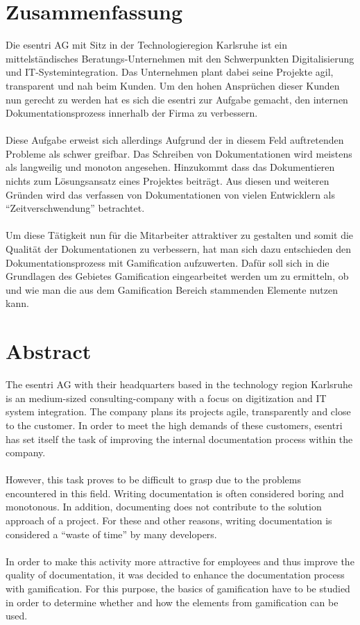 \documentclass[a4paper,12pt,twoside]{scrartcl}
\begin{document}
\section*{Zusammenfassung}
Die esentri AG mit Sitz in der Technologieregion Karlsruhe ist ein mittelständisches Beratungs-Unternehmen mit den Schwerpunkten Digitalisierung und IT-Systemintegration. 
Das Unternehmen plant dabei seine Projekte agil, transparent und nah beim Kunden.
Um den hohen Ansprüchen dieser Kunden nun gerecht zu werden hat es sich die esentri zur Aufgabe gemacht, den internen Dokumentationsprozess innerhalb der Firma zu verbessern. 
\\\\
Diese Aufgabe erweist sich allerdings Aufgrund der in diesem Feld auftretenden Probleme als schwer greifbar. Das Schreiben von Dokumentationen wird meistens als langweilig und monoton angesehen. Hinzukommt dass das Dokumentieren nichts zum Lösungsansatz eines Projektes beiträgt. Aus diesen und weiteren Gründen wird das verfassen von Dokumentationen von vielen Entwicklern als “Zeitverschwendung” betrachtet. 
\\\\
Um diese Tätigkeit nun für die Mitarbeiter attraktiver zu gestalten und somit die Qualität der Dokumentationen zu verbessern, hat man sich dazu entschieden den Dokumentationsprozess mit Gamification aufzuwerten. Dafür soll sich in die Grundlagen des Gebietes Gamification eingearbeitet werden um zu ermitteln, ob und wie man die aus dem Gamification Bereich stammenden Elemente nutzen kann.


\section*{Abstract}
The esentri AG with their headquarters based in the technology region Karlsruhe is an medium-sized consulting-company with a focus on digitization and IT system integration. The company plans its projects agile, transparently and close to the customer. In order to meet the high demands of these customers, esentri has set itself the task of improving the internal documentation process within the company. 
\\\\
However, this task proves to be difficult to grasp due to the problems encountered in this field. Writing documentation is often considered boring and monotonous. In addition, documenting does not contribute to the solution approach of a project. For these and other reasons, writing documentation is considered a \enquote{waste of time} by many developers. 
\\\\
In order to make this activity more attractive for employees and thus improve the quality of documentation, it was decided to enhance the documentation process with gamification. For this purpose, the basics of gamification have to be studied in order to determine whether and how the elements from gamification can be used.     
\newpage
\thispagestyle{empty}
\tableofcontents
\thispagestyle{empty}
\newpage

\end{document}
